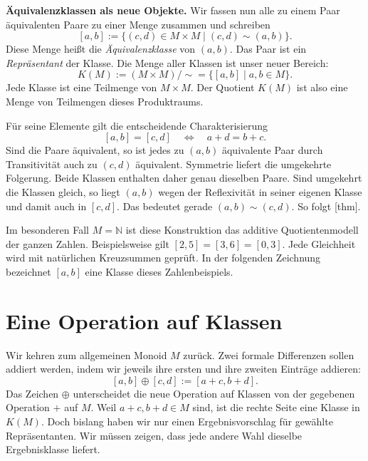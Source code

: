 \medskip\noindent\textbf{Äquivalenzklassen als neue Objekte.}
\hypertarget{differences.reading.classes}{}
Wir fassen nun alle zu einem Paar äquivalenten Paare zu einer
Menge zusammen und schreiben
\[
  [a,b]:=\{(c,d)\in M\times M\mid(c,d)\sim(a,b)\}.
\]
Diese Menge heißt die \emph{Äquivalenzklasse} von \((a,b)\).
Das Paar ist ein \emph{Repräsentant} der Klasse. Die Menge aller
Klassen ist unser neuer Bereich:
\[
  K(M):=(M\times M)/{\sim}
       =\{[a,b]\mid a,b\in M\}.
\]
Jede Klasse ist eine Teilmenge von \(M\times M\). Der Quotient
\(K(M)\) ist also eine Menge von Teilmengen dieses Produktraums.

Für seine Elemente gilt die entscheidende Charakterisierung
\[
  [a,b]=[c,d]
  \quad\Longleftrightarrow\quad a+d=b+c.
\]
Sind die Paare äquivalent, so ist jedes zu \((a,b)\) äquivalente
Paar durch Transitivität auch zu \((c,d)\) äquivalent. Symmetrie
liefert die umgekehrte Folgerung. Beide Klassen enthalten daher
genau dieselben Paare. Sind umgekehrt die Klassen gleich, so liegt
\((a,b)\) wegen der Reflexivität in seiner eigenen Klasse und
damit auch in \([c,d]\). Das bedeutet gerade
\((a,b)\sim(c,d)\).
So folgt [thm].

Im besonderen Fall \(M=\mathbb N\) ist diese Konstruktion das
additive Quotientenmodell der ganzen Zahlen. Beispielsweise gilt
\([2,5]=[3,6]=[0,3]\). Jede Gleichheit wird mit natürlichen
Kreuzsummen geprüft. In der folgenden Zeichnung bezeichnet
\([a,b]\) eine Klasse dieses Zahlenbeispiels.

\DifferencesPairGrid

\par{}
\hypertarget{differences.reading.addition}{}
\section*{Eine Operation auf Klassen}

Wir kehren zum allgemeinen Monoid \(M\) zurück. Zwei formale
Differenzen sollen addiert werden, indem wir jeweils ihre ersten
und ihre zweiten Einträge addieren:
\[
  [a,b]\oplus[c,d]:=[a+c,b+d].
\]
Das Zeichen \(\oplus\) unterscheidet die neue Operation auf
Klassen von der gegebenen Operation \(+\) auf \(M\).
Weil \(a+c,b+d\in M\) sind, ist die rechte Seite eine Klasse
in \(K(M)\). Doch bislang haben wir nur einen Ergebnisvorschlag
für gewählte Repräsentanten. Wir müssen zeigen, dass jede andere
Wahl dieselbe Ergebnisklasse liefert.

